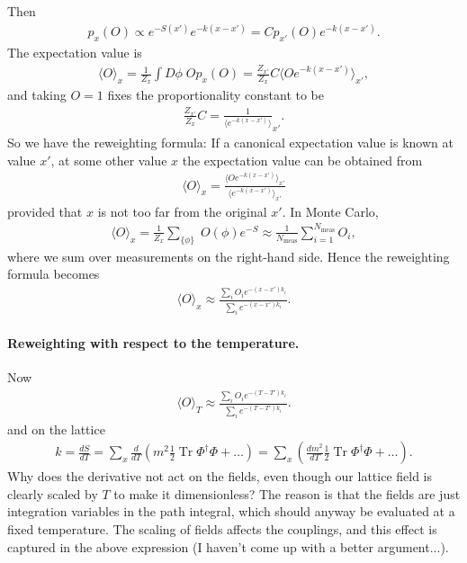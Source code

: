 \documentclass[11pt,a4paper]{article}
\newcommand\Tr{\operatorname{Tr}}
\newcommand\lauri[1]{{\color{myorange}#1}}
\begin{document}
Then 
\begin{align}
p_{x}(O) \propto e^{-S(x')} e^{-k(x-x')} = C p_{x'}(O) e^{-k(x-x')}.
\end{align}
The expectation value is
\begin{align}
\langle O \rangle_x = \frac{1}{Z_x} \int D\phi \; O p_{x}(O) = \frac{Z_{x'}}{Z_x}C \langle O e^{-k(x-x')} \rangle_{x'},
\end{align}
and taking $O=1$ fixes the proportionality constant to be  
\begin{align}
\frac{Z_{x'}}{Z_x}C = \frac{1}{\langle e^{-k(x-x')}\rangle }_{x'}.
\end{align}
So we have the reweighting formula: If a canonical expectation value is known at value $x'$, at some other value $x$ the expectation value can be obtained from
\begin{align}
\langle O \rangle_x =  \frac{\langle O e^{-k(x-x')} \rangle_{x'}}{\langle e^{-k(x-x')}\rangle_{x'}}
\end{align}
provided that $x$ is not too far from the original $x'$. In Monte Carlo, 
\begin{align}
\langle O \rangle_x = \frac{1}{Z_x} \sum_{\{\phi\}} \; O(\phi) e^{-S} \approx \frac{1}{N_\text{meas}} \sum_{i=1}^{N_\text{meas}} O_i,
\end{align}
where we sum over measurements on the right-hand side. Hence the reweighting formula becomes
\begin{align}
\langle O \rangle_x \approx \frac{\sum_i O_i e^{-(x -x')k_i}}{\sum_i e^{-(x -x')k_i}}.
\end{align}

\paragraph{Reweighting with respect to the temperature.}

Now 
\begin{align}
\langle O \rangle_T \approx \frac{\sum_i O_i e^{-(T -T')k_i}}{\sum_i e^{-(T -T')k_i}}.
\end{align}
and on the lattice 
\begin{align}
k = \frac{dS}{dT} = \sum_x \frac{d}{dT} \left( m^2 \frac12 \Tr\Phi^\dagger\Phi + \dots \right) =  \sum_x \left( \frac{dm^2}{dT} \frac12 \Tr\Phi^\dagger\Phi + \dots \right).
\end{align}
Why does the derivative not act on the fields, even though our lattice field is clearly scaled by $T$ to make it dimensionless? The reason is that the fields are just integration variables in the path integral, which should anyway be evaluated at a fixed temperature. The scaling of fields affects the couplings, and this effect is captured in the above expression (\lauri{I haven't come up with a better argument...}). 
\end{document}
